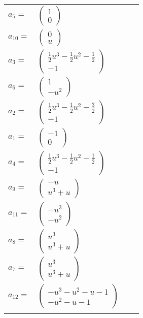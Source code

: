 \documentclass[1p]{elsarticle_modified}
\theoremstyle{definition}
\begin{document}
\begin{tabular}{m{7pt} m{180pt} m{7pt} m{180pt} }
\flushright $a_{5}=$&$\begin{pmatrix}1\\0\end{pmatrix}$ \\
\flushright $a_{10}=$&$\begin{pmatrix}0\\u\end{pmatrix}$ \\
\flushright $a_{3}=$&$\begin{pmatrix}\frac{1}{2} u^3-\frac{1}{2} u^2-\frac{1}{2}\\-1\end{pmatrix}$ \\
\flushright $a_{6}=$&$\begin{pmatrix}1\\- u^2\end{pmatrix}$ \\
\flushright $a_{2}=$&$\begin{pmatrix}\frac{1}{2} u^3-\frac{1}{2} u^2-\frac{3}{2}\\-1\end{pmatrix}$ \\
\flushright $a_{1}=$&$\begin{pmatrix}-1\\0\end{pmatrix}$ \\
\flushright $a_{4}=$&$\begin{pmatrix}\frac{1}{2} u^3-\frac{1}{2} u^2-\frac{1}{2}\\-1\end{pmatrix}$ \\
\flushright $a_{9}=$&$\begin{pmatrix}- u\\u^3+u\end{pmatrix}$ \\
\flushright $a_{11}=$&$\begin{pmatrix}- u^3\\- u^2\end{pmatrix}$ \\
\flushright $a_{8}=$&$\begin{pmatrix}u^3\\u^3+u\end{pmatrix}$ \\
\flushright $a_{7}=$&$\begin{pmatrix}u^3\\u^3+u\end{pmatrix}$ \\
\flushright $a_{12}=$&$\begin{pmatrix}- u^3- u^2- u-1\\- u^2- u-1\end{pmatrix}$\\&\end{tabular}
\end{document}
